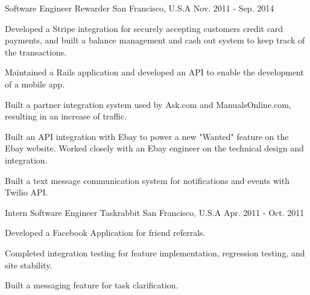 \begin{cventries}
  \cventry
    {Software Engineer}
    {Rewarder}
    {San Francisco, U.S.A}
    {Nov. 2011 - Sep. 2014}
    {
      \begin{cvitems}
        \item {Developed a Stripe integration for securely accepting customers credit card payments, and built a balance management and cash out system to keep track of the transactions.}
        \item {Maintained a Rails application and developed an API to enable the development of a mobile app.}
        \item {Built a partner integration system used by Ask.com and ManualsOnline.com, resulting in an increase of traffic.}
        \item {Built an API integration with Ebay to power a new "Wanted" feature on the Ebay website. Worked closely with an Ebay engineer on the technical design and integration.}
        \item{Built a text message communication system for notifications and events with Twilio API.}
      \end{cvitems}
    }
    
  \cventry
    {Intern Software Engineer}
    {Taskrabbit}
    {San Francisco, U.S.A}
    {Apr. 2011 - Oct. 2011}
    {
      \begin{cvitems}
        \item {Developed a Facebook Application for friend referrals.}
        \item{Completed integration testing for feature implementation, regression testing, and site stability.}
        \item{Built a messaging feature for task clarification.}
      \end{cvitems}
    }
\end{cventries}
